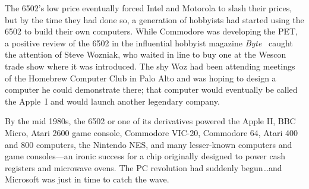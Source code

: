 The 6502's low price eventually forced Intel and Motorola to slash their
prices, but by the time they had done so, a generation of hobbyists had
started using the 6502 to build their own computers.
While Commodore was developing the PET,
a positive review of the 6502 in
the influential hobbyist magazine \emph{Byte}~\cite{byte75:6502} caught
the attention of Steve Wozniak, who waited in line to buy one
at the Wescon trade show where it was introduced.
The shy Woz had been attending meetings of the Homebrew Computer Club in
Palo Alto and was hoping to design a computer he could demonstrate
there; that computer would eventually be called the Apple~I and would
launch another legendary company.

By the mid 1980s, the 6502 or one of its derivatives powered the Apple
II, BBC Micro, Atari 2600 game console, Commodore VIC-20, Commodore 64,
Atari 400 and 800 computers, the Nintendo NES, and many lesser-known
computers and game consoles---an ironic success for a chip
originally designed to power cash registers and microwave ovens.
The PC revolution had suddenly begun\ldots{}and Microsoft was just in time
to catch the wave.

